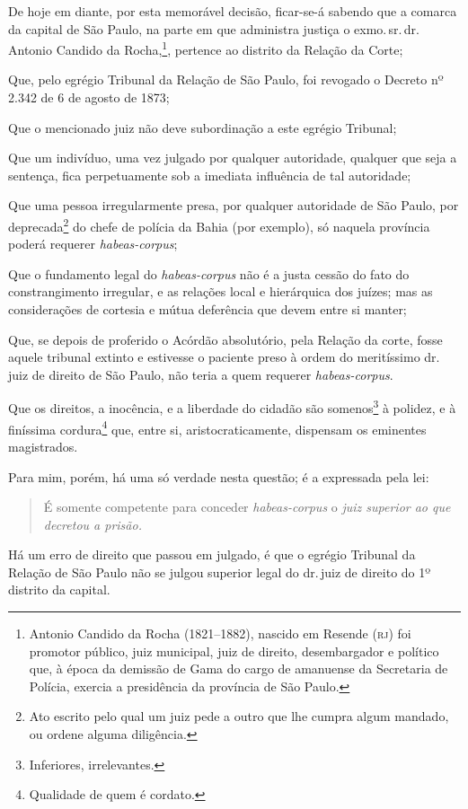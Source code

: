 De hoje em diante, por esta memorável decisão, ficar-se-á sabendo que a
comarca da capital de São Paulo, na parte em que administra justiça o
exmo.\,sr.\,dr.\,Antonio Candido da Rocha,\footnote{ Antonio Candido da
  Rocha (1821--1882), nascido em Resende (\textsc{rj}) foi promotor público, juiz
  municipal, juiz de direito, desembargador e político que, à época da
  demissão de Gama do cargo de amanuense da Secretaria de Polícia,
  exercia a presidência da província de São Paulo.}, pertence ao
distrito da Relação da Corte;

Que, pelo egrégio Tribunal da Relação de São Paulo, foi revogado o
Decreto nº 2.342 de 6 de agosto de 1873;

Que o mencionado juiz não deve subordinação a este egrégio Tribunal;

Que um indivíduo, uma vez julgado por qualquer autoridade, qualquer que
seja a sentença, fica perpetuamente sob a imediata influência de tal
autoridade;

Que uma pessoa irregularmente presa, por qualquer autoridade de São
Paulo, por deprecada\footnote{ Ato escrito pelo qual um juiz pede a
  outro que lhe cumpra algum mandado, ou ordene alguma diligência.} do
chefe de polícia da Bahia (por exemplo), só naquela província poderá
requerer \emph{habeas-corpus};

Que o fundamento legal do \emph{habeas-corpus} não é a justa cessão do
fato do constrangimento irregular, e as relações local e hierárquica dos
juízes; mas as considerações de cortesia e mútua deferência que devem
entre si manter;

Que, se depois de proferido o Acórdão absolutório, pela Relação da
corte, fosse aquele tribunal extinto e estivesse o paciente preso à
ordem do meritíssimo dr.\,juiz de direito de São Paulo, não teria a quem
requerer \emph{habeas-corpus}.

Que os direitos, a inocência, e a liberdade do cidadão são
somenos\footnote{ Inferiores, irrelevantes.} à polidez, e à finíssima
cordura\footnote{ Qualidade de quem é cordato.} que, entre si,
aristocraticamente, dispensam os eminentes magistrados.

Para mim, porém, há uma só verdade nesta questão; é a expressada pela
lei:

\begin{quote}
É somente competente para conceder \emph{habeas-corpus} o \emph{juiz
superior ao que decretou a prisão.}
\end{quote}

Há um erro de direito que passou em julgado, é que o egrégio Tribunal da
Relação de São Paulo não se julgou superior legal do dr.\,juiz de direito
do 1º distrito da capital.


